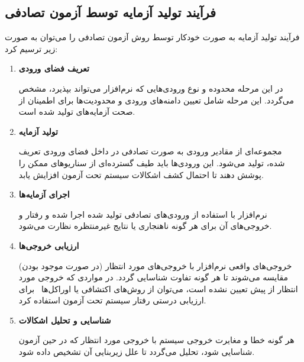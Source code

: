 \subsection{فرآیند تولید آزمایه توسط آزمون تصادفی}

فرآیند تولید آزمایه به صورت خودکار توسط روش آزمون تصادفی را می‌توان به صورت زیر ترسیم کرد:

\begin{enumerate}
	\item \textbf{تعریف فضای ورودی}
	
	 در این مرحله محدوده و نوع ورودی‌هایی که نرم‌افزار می‌تواند بپذیرد، مشخص می‌گردد. این مرحله شامل تعیین دامنه‌های ورودی و محدودیت‌ها برای اطمینان از صحت آزمایه‌های تولید شده است.
	\item \textbf{تولید آزمایه}
	
	 مجموعه‌ای از مقادیر ورودی به صورت تصادفی در داخل فضای ورودی تعریف شده، تولید می‌شود. این ورودی‌ها باید طیف گسترده‌ای از سناریوهای ممکن را پوشش دهند تا احتمال کشف اشکالات سیستم تحت آزمون افزایش یابد.
	\item \textbf{اجرای آزمایه‌ها}
	
	 نرم‌افزار با استفاده از ورودی‌های تصادفی تولید شده اجرا شده و رفتار و خروجی‌های آن برای هر گونه ناهنجاری یا نتایج غیرمنتظره نظارت می‌شود.
	\item \textbf{ارزیابی خروجی‌ها}
	
	 خروجی‌های واقعی نرم‌افزار با خروجی‌های مورد انتظار (در صورت موجود بودن) مقایسه می‌شوند تا هر گونه تفاوت شناسایی گردد. در مواردی که خروجی مورد انتظار از پیش تعیین نشده است، می‌توان از روش‌های اکتشافی یا اوراکل‌ها~\cite{nardi2015survey}
	 برای ارزیابی درستی رفتار سیستم تحت آزمون استفاده کرد.
	\item \textbf{شناسایی و تحلیل اشکالات}
	
	 هر گونه خطا و مغایرت خروجی سیستم با خروجی مورد انتظار که در حین آزمون شناسایی شود، تحلیل می‌گردد تا علل زیربنایی آن تشخیص داده شود.
	 
\end{enumerate}

